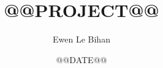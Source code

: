 \documentclass{article}
\title{@@PROJECT@@}
\date{@@DATE@@}
\author{Ewen Le Bihan}
\begin{document}
\maketitle

\section{}
\end{document}
